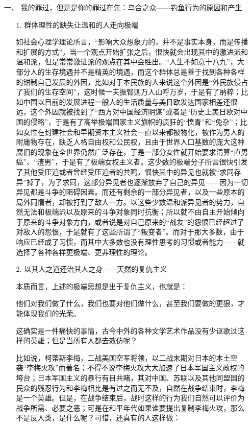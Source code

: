 \documentclass{ctexart}
\begin{document}
	\begin{itemize}
	
	\item[一、]我的罪过，但是是你的罪过在先：乌合之众——钓鱼行为的原因和产生
	
	\begin{itemize}
	\item[$1.$]  群体理性的缺失让温和的人走向极端
	
	如社会心理学理论所言，“影响大众想象力的，并不是事实本身，而是传播和扩展的方式”，当一个观点开始扩张之后，很快就会出现其中的激进派和温和派，但是常常激进派的观点在其中会胜出。“人生不如意十八九”，大部分人的生存境遇并不是精英的境遇，而这个群体总是善于找到各种各样的钳制自己发展的外因，比如对于本民族的人来说这个外因是“外民族侵占了我们的生存空间”，这时候一夫振臂则万人山呼万岁，于是有了纳粹；比如中国以目前的发展进程一般人的生活质量与美日欧发达国家相差还很远，这个外因就被找到了“西方对中国经济阴谋”或者是“历史上美日欧对中国的侵略”，于是有了高举极端国家主义旗帜的疯狂的“愤青”和“兔杂”；比如女性在封建社会和早期资本主义社会一直以来都被物化，被作为男人的附庸物存在，缺乏人格自由权和公民权，且由于世界人口基数的庞大这种腐旧的现象在全世界仍然广泛存在，于是一部分女性就开始要求清算“直男癌”、“渣男”，于是有了极端女权主义者。这少数的极端分子所言很快引发了其他受压迫或者曾经受压迫者的共鸣，很快其中的异见也就被“求同存异”掉了，为了求同，这部分异见者也逐渐放弃了自己的异见——因为一切异见都是斗争的阻碍因素。而还有剩余的一部分异见者，以及一些原本的局外同情者，却被打到了敌人一方。以这些少数温和派异见者的势力，自然无法和极端派以及原来的斗争对象同时抗衡；所以就不由自主开始倾向于原来的斗争对象方向，或者说是对自己原来的“战友”的怨恨已经超过了对敌人的怨恨，于是就有了这些所谓了“叛变者”。而对于那大多数，由于响应已经成了习惯，而其中大多数也没有理性思考的习惯或者能力——就选择了各种各样更极端、更非理性的理论。
	
	\item[$2.$] 以其人之道还治其人之身——天然的复仇主义
	
	本质而言，上述的极端思想是出于复仇主义，也就是：
	
	他们对我们做了什么，我们也要对他们做什么，甚至我们要做的更狠，才能体现我们的光荣。
	
	这确实是一件痛快的事情，古今中外的各种文学艺术作品没有少讴歌过这样的英雄；但是当所有人都去效仿呢？
	
	比如说，柯蒂斯李梅，二战美国空军将领，以二战末期对日本的本土空袭“李梅火攻”而著名；不得不说李梅火攻大大加速了日本军国主义政权的垮台；日本军国主义的暴行有目共睹，其对中国、苏联以及其他同盟国的民众的残忍行为和李梅相比是有过之而无不及，自然在战争结束时，李梅是一个英雄。但是，在战争结束后，战时这样的行为我们自然可以评价为战争所需、必要之恶；可是在和平年代如果谁要提出复制李梅火攻，那么不是反人类，是什么呢？可惜，还真有的人这样做：
	

\end{itemize}
\end{itemize}
\end{document}
